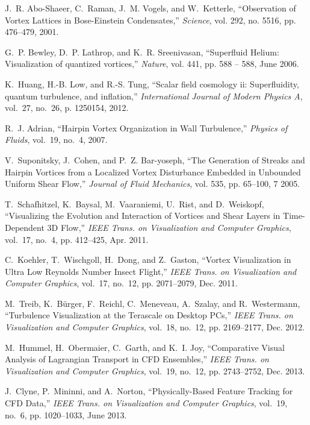 \documentclass[10pt,journal,compsoc,twoside]{IEEEtran}
\begin{document}
\begin{thebibliography}{10}
		J.~R. Abo-Shaeer, C.~Raman, J.~M. Vogels, and W.~Ketterle, ``{Observation of
			Vortex Lattices in Bose-Einstein Condensates},'' \emph{Science}, vol. 292,
		no. 5516, pp. 476--479, 2001.
		
		G.~P. Bewley, D.~P. Lathrop, and K.~R. Sreenivasan, ``{Superfluid Helium:
			Visualization of quantized vortices},'' \emph{Nature}, vol. 441, pp. 588 --
		588, June 2006.
		
		K.~Huang, H.-B. Low, and R.-S. Tung, ``Scalar field cosmology ii:
		Superfluidity, quantum turbulence, and inflation,'' \emph{International
			Journal of Modern Physics A}, vol.~27, no.~26, p. 1250154, 2012.
		
		R.~J. Adrian, ``{Hairpin Vortex Organization in Wall Turbulence},''
		\emph{Physics of Fluids}, vol.~19, no.~4, 2007.
		
		V.~Suponitsky, J.~Cohen, and P.~Z. Bar-yoseph, ``{The Generation of Streaks and
			Hairpin Vortices from a Localized Vortex Disturbance Embedded in Unbounded
			Uniform Shear Flow},'' \emph{Journal of Fluid Mechanics}, vol. 535, pp.
		65--100, 7 2005.
		
		T.~Schafhitzel, K.~Baysal, M.~Vaaraniemi, U.~Rist, and D.~Weiskopf,
		``{Visualizing the Evolution and Interaction of Vortices and Shear Layers in
			Time-Dependent 3D Flow},'' \emph{IEEE Trans. on Visualization and
			Computer Graphics}, vol.~17, no.~4, pp. 412--425, Apr. 2011.
		
		C.~Koehler, T.~Wischgoll, H.~Dong, and Z.~Gaston, ``{Vortex Visualization in
			Ultra Low Reynolds Number Insect Flight},'' \emph{IEEE Trans. on
			Visualization and Computer Graphics}, vol.~17, no.~12, pp. 2071--2079, Dec.
		2011.
		
		M.~Treib, K.~B\"{u}rger, F.~Reichl, C.~Meneveau, A.~Szalay, and R.~Westermann,
		``{Turbulence Visualization at the Terascale on Desktop PCs},'' \emph{IEEE
			Trans. on Visualization and Computer Graphics}, vol.~18, no.~12, pp.
		2169--2177, Dec. 2012.
		
		M.~Hummel, H.~Obermaier, C.~Garth, and K.~I. Joy, ``{Comparative Visual
			Analysis of Lagrangian Transport in CFD Ensembles},'' \emph{IEEE Trans. 
			on Visualization and Computer Graphics}, vol.~19, no.~12, pp. 2743--2752,
		Dec. 2013.
		
		J.~Clyne, P.~Mininni, and A.~Norton, ``{Physically-Based Feature Tracking for
			CFD Data},'' \emph{IEEE Trans. on Visualization and Computer Graphics},
		vol.~19, no.~6, pp. 1020--1033, June 2013.
		

\end{thebibliography}
\end{document}
